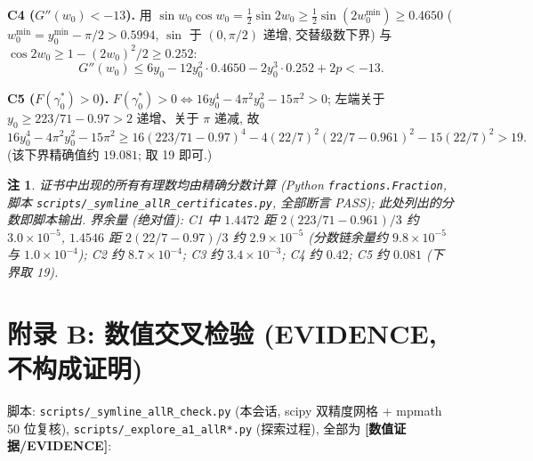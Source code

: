 \documentclass[UTF8]{ctexart}
\newtheorem{remark}[theorem]{注}
\newcommand{\EVID}{\textbf{[数值证据/EVIDENCE]}}
\begin{document}
\textbf{C4 ($G''(w_0)<-13$).} 用 $\sin w_0\cos w_0=\frac12\sin2w_0
\ge\frac12\sin(2w_0^{\min})\ge0.4650$ ($w_0^{\min}=y_0^{\min}-\pi/2
>0.5994$, $\sin$ 于 $(0,\pi/2)$ 递增, 交替级数下界) 与
$\cos2w_0\ge1-(2w_0)^2/2\ge0.252$:
\begin{equation*}
	G''(w_0)\le6y_0-12y_0^2\cdot0.4650-2y_0^3\cdot0.252+2p
	<-13.
\end{equation*}

\textbf{C5 ($F(\gamma_0^*)>0$).} $F(\gamma_0^*)>0\iff
16y_0^4-4\pi^2y_0^2-15\pi^2>0$; 左端关于 $y_0\ge223/71-0.97>2$ 递增、关于 $\pi$ 递减,
故
\begin{equation*}
	16y_0^4-4\pi^2y_0^2-15\pi^2
	\ge16(223/71-0.97)^4-4(22/7)^2(22/7-0.961)^2
	-15(22/7)^2
	>19.
\end{equation*}
(该下界精确值约 $19.081$; 取 19 即可.)

\begin{remark}
证书中出现的所有有理数均由精确分数计算 (Python \texttt{fractions.Fraction},
脚本 \texttt{scripts/\_symline\_allR\_certificates.py}, 全部断言 PASS);
此处列出的分数即脚本输出. 界余量 (绝对值): C1 中 $1.4472$ 距
$2(223/71-0.961)/3$ 约 $3.0\times10^{-5}$, $1.4546$ 距
$2(22/7-0.97)/3$ 约 $2.9\times10^{-5}$ (分数链余量约 $9.8\times10^{-5}$
与 $1.0\times10^{-4}$); C2 约 $8.7\times10^{-4}$; C3 约
$3.4\times10^{-3}$; C4 约 $0.42$; C5 约 $0.081$ (下界取 19).
\end{remark}

\section{附录 B: 数值交叉检验 (EVIDENCE, 不构成证明)}\label{app:evid}

脚本: \texttt{scripts/\_symline\_allR\_check.py} (本会话, scipy 双精度网格
+ mpmath 50 位复核), \texttt{scripts/\_explore\_a1\_allR*.py} (探索过程),
全部为 \EVID{}:
\end{document}
